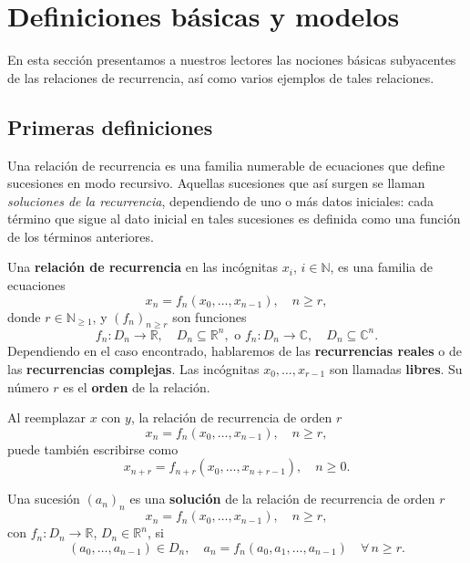 \section{Definiciones básicas y modelos}
En esta sección presentamos a nuestros lectores las nociones básicas subyacentes de las relaciones de recurrencia, así como varios ejemplos de tales relaciones.

\subsection{Primeras definiciones}
Una relación de recurrencia es una familia numerable de ecuaciones que define sucesiones en modo recursivo. Aquellas sucesiones que así surgen se llaman \emph{soluciones de la recurrencia}, dependiendo de uno o más datos iniciales: cada término que sigue al dato inicial en tales sucesiones es definida como una función de los términos anteriores.

\begin{definition}
Una \textbf{relación de recurrencia} en las incógnitas $x_{i}$, $i\in\mathds{N}$, es una familia de ecuaciones
\begin{equation*}
x_{n}=f_{n}\left(x_{0},\ldots,x_{n-1}\right),\quad n\geq r,
\end{equation*}
donde $r\in\mathbb{N}_{\geq1}$, y ${\left(f_{n}\right)}_{n\geq r}$ son funciones
\begin{equation*}
f_{n}\colon D_{n}\rightarrow\mathbb{R},\quad D_{n}\subseteq\mathbb{R}^{n},\text{ o }f_{n}\colon D_{n}\rightarrow\mathbb{C},\quad D_{n}\subseteq\mathbb{C}^{n}.
\end{equation*}
Dependiendo en el caso encontrado, hablaremos de las \textbf{recurrencias reales} o de las \textbf{recurrencias complejas}. Las incógnitas $x_{0},\ldots,x_{r-1}$ son llamadas \textbf{libres}. Su número $r$ es el \textbf{orden} de la relación.

Al reemplazar $x$ con $y$, la relación de recurrencia de orden $r$
\begin{equation*}
x_{n}=f_{n}\left(x_{0},\ldots,x_{n-1}\right),\quad n\geq r,
\end{equation*}
puede también escribirse como
\begin{equation*}
x_{n+r}=f_{n+r}\left(x_{0},\ldots,x_{n+r-1}\right),\quad n\geq0.
\end{equation*}
\end{definition}

\begin{definition}
Una sucesión ${\left(a_{n}\right)}_{n}$ es una \textbf{solución} de la relación de recurrencia de orden $r$
\begin{equation}
x_{n}=f_{n}\left(x_{0},\ldots,x_{n-1}\right),\quad n\geq r,
\end{equation}
con $f_{n}\colon D_{n}\rightarrow\mathbb{R}$, $D_{n}\in\mathbb{R}^{n}$, si
\begin{equation*}
\left(a_{0},\ldots,a_{n-1}\right)\in D_{n},\quad a_{n}=f_{n}\left(a_{0},a_{1},\ldots,a_{n-1}\right)\quad\forall\,n\geq r.
\end{equation*}
\end{definition}


